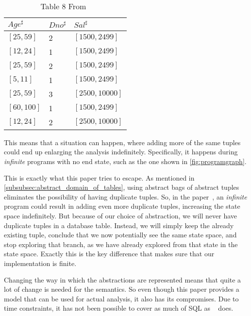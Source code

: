 \begin{table}
    \renewcommand{\arraystretch}{1.3}
    \centering
    \caption{Table 8 From~\cite{halder_abstract_2012}}
    \begin{tabular}{lll}
        \toprule
        $Age^\sharp$ & $Dno^\sharp$ & $Sal^\sharp$   \\ \midrule
        $[25,59]$    & 2            & $[1500,2499]$  \\
        $[12,24]$    & 1            & $[1500,2499]$  \\
        $[25,59]$    & 2            & $[1500,2499]$  \\
        $[5,11]$     & 1            & $[1500,2499]$  \\
        $[25,59]$    & 3            & $[2500,10000]$ \\
        $[60,100]$   & 1            & $[1500,2499]$  \\
        $[12,24]$    & 2            & $[2500,10000]$ \\ \bottomrule
    \end{tabular}\label{tab:table-halder}
\end{table}


This means that a situation can happen, where adding more of the same tuples could end up enlarging the analysis indefinitely.
Specifically, it happens during \textit{infinite} programs with no end state, such as the one shown in \autoref{fig:programgraph}.


This is exactly what this paper tries to escape.
As mentioned in \autoref{subsubsec:abstract_domain_of_tables}, using abstract bags of abstract tuples eliminates the possibility of having duplicate tuples.
So, in the paper~\cite{halder_abstract_2012}, an \textit{infinite} program could result in adding even more duplicate tuples, increasing the state space indefinitely.
But because of our choice of abstraction, we will never have duplicate tuples in a database table.
Instead, we will simply keep the already existing tuple, conclude that we now potentially see the same state space, and stop exploring that branch, as we have already explored from that state in the state space.
Exactly this is the key difference that makes sure that our implementation is finite.

Changing the way in which the abstractions are represented means that quite a lot of change is needed for the semantics.
So even though this paper provides a model that can be used for actual analysis, it also has its compromises.
Due to time constraints, it has not been possible to cover as much of SQL as ~\cite{halder_abstract_2012} does.

